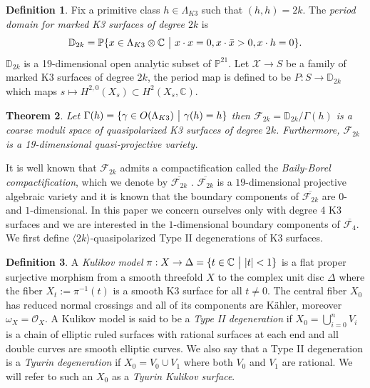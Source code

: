 \documentclass[a4paper]{amsart}
\theoremstyle{definition}
\newtheorem{defn}{Definition}[section]
\theoremstyle{plain}
\newtheorem{theorem}[defn]{Theorem}
\theoremstyle{remark}
\newcommand{\PS}{\mathbb{P}}
\newcommand{\C}{\mathbb{C}}
\newcommand{\D}{\mathbb{D}}
\begin{document}
\begin{defn}
Fix a primitive class $h\in \Lambda_{K3}$ such that $(h,h)=2k$. The \emph{period domain for marked K3 surfaces of degree $2k$} is
$$\D_{2k} = \PS\{x \in \Lambda_{K3}\otimes\C \text{ }\big{|}\text{ } x\cdot x=0,x\cdot\bar{x}>0,x\cdot h=0\}.$$
$\D_{2k}$ is a 19-dimensional open analytic subset of $\PS^{21}$. Let $\mathcal{X}\rightarrow S$ be a family of marked K3 surfaces of degree $2k$, the period map is defined to be $P: S\rightarrow \D_{2k}$ which maps $s \mapsto H^{2,0}(X_s)\subset H^2(X_s,\C).$
\end{defn}

\begin{theorem}\cite[Corollary 6.4.3, Remark 6.4.5]{Huy16}
Let $\Gamma(h) = \{\gamma \in O(\Lambda_{K3}) \text{ } \big{|} \text{ } \gamma(h) = h\}$ then $\mathcal{F}_{2k}=\D_{2k}/\Gamma(h)$ is a coarse moduli space of quasipolarized K3 surfaces of degree $2k$. Furthermore, $\mathcal{F}_{2k}$ is a 19-dimensional quasi-projective variety. 
\end{theorem}

It is well known that $\mathcal{F}_{2k}$ admits a compactification called the \emph{Baily-Borel compactification}, which we denote by $\overline{\mathcal{F}_{2k}}$ \cite{BB66}. $\overline{\mathcal{F}_{2k}}$ is a $19$-dimensional projective algebraic variety and it is known that the boundary components of $\overline{\mathcal{F}_{2k}}$ are $0$- and $1$-dimensional. In this paper we concern ourselves only with degree 4 K3 surfaces and we are interested in the $1$-dimensional boundary components of $\overline{\mathcal{F}_{4}}$. We first define $\langle 2k \rangle$-quasipolarized Type II degenerations of K3 surfaces.

\begin{defn}
A \emph{Kulikov model} $\pi: X\rightarrow \Delta=\{t\in\C \text{ } \big{|} \text{ } |t|<1\}$ is a flat proper surjective morphism from a smooth threefold $X$ to the complex unit disc $\Delta$ where the fiber $X_t:=\pi^{-1}(t)$ is a smooth K3 surface for all $t\neq 0$. The central fiber $X_0$ has reduced normal crossings and all of its components are K\"ahler, moreover $\omega_X = \mathcal{O}_X$. A Kulikov model is said to be a \emph{Type II degeneration} if 
$X_0=\bigcup_{i=0}^nV_i$
is a chain of elliptic ruled surfaces with rational surfaces at each end and all double curves are smooth elliptic curves. We also say that a Type II degeneration is a \emph{Tyurin degeneration} if $X_0=V_0\cup V_1$ where both $V_0$ and $V_1$ are rational. We will refer to such an $X_0$ as a \emph{Tyurin Kulikov surface}. 
\end{defn}
\end{document}
